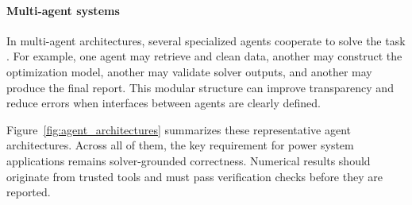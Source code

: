 \documentclass[journal,onecolumn]{IEEEtran} %
\newcommand{\todo}[1]{\color{red}#1\color{black}}
\newcommand{\dani}[1]{\color{blue}#1\color{black}}
\begin{document}

\paragraph{Multi-agent systems}
In multi-agent architectures, several specialized agents cooperate to solve the task \cite{wu2023autogen}. For example, one agent may retrieve and clean data, another may construct the optimization model, another may validate solver outputs, and another may produce the final report. This modular structure can improve transparency and reduce errors when interfaces between agents are clearly defined.

{Figure~\ref{fig:agent_architectures} summarizes these representative agent architectures. Across all of them, } the key requirement for power system applications remains solver-grounded correctness. Numerical results should originate from trusted tools and must pass verification checks before they are reported. %

\end{document}
